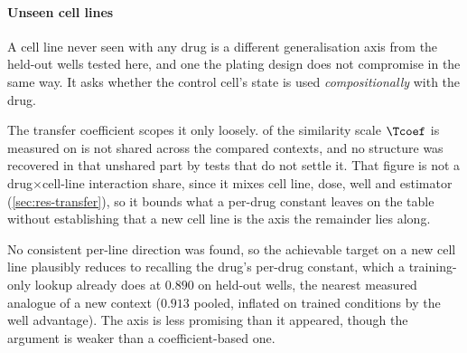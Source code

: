 \paragraph{Unseen cell lines} A cell line never seen with any drug is a
different generalisation axis from the held-out wells tested here, and one the
plating design does not compromise in the same way. It asks whether the control
cell's state is used \emph{compositionally} with the
drug.

The transfer coefficient scopes it only loosely.  of
the similarity scale $\Tcoef$ is measured on is not shared across the compared
contexts, and no structure was recovered in that unshared part by tests that do
not settle it. That figure is not a drug$\times$cell-line interaction share,
since it mixes cell line, dose, well and estimator (\cref{sec:res-transfer}), so
it bounds what a per-drug constant leaves on the table without establishing that
a new cell line is the axis the remainder lies along.

No consistent per-line direction was found, so the achievable target on a new
cell line plausibly reduces to recalling the drug's per-drug constant, which a
training-only lookup already does at $0.890$ on held-out wells, the nearest
measured analogue of a new context ($0.913$ pooled, inflated on trained
conditions by the well advantage). The axis is less promising than it appeared,
though the argument is weaker than a coefficient-based one.

